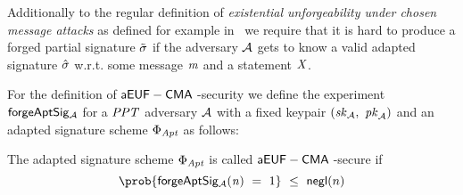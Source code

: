 \begin{definition}[$\cnstaEUFCMA$]\label{def:aeufcma}
Additionally to the regular definition of \textit{existential unforgeability under chosen message attacks} as defined for example in~\cite{vaudenay2006classical} we require that it is hard to produce a forged partial signature $\tilde{\sigma}$ if the
adversary $\mathcal{A}$ gets to know a valid adapted signature $\hat{\sigma}$ w.r.t. some message $\mathit{m}$ and a statement $\mathit{X}$.

For the definition of $\cnstaEUFCMA$-security we define the experiment $\mathsf{forgeAptSig_{\mathcal{A}}}$ for a $\mathit{PPT}$ adversary $\mathcal{A}$ with a fixed keypair $(\mathit{sk}_{\mathcal{A}} ,~ \mathit{pk}_{\mathcal{A}})$ and an adapted signature scheme $\Phi_{\mathit{Apt}}$ as
follows:

\begin{center}
    \fbox{
    \begin{varwidth}{\textwidth}
        \procedure[linenumbering]{$\procExpForg{\varN}$} {
        \varSet \opAssign \cnstEmptySet \\
        \varMsg \opFunResult \cnstAdversary^{\procSignOracle{\cdot}}(\varPubKeyAdv) \\
        (\varWit \opSeperate \varStatement) \opFunResult \procGenR{\varSecParam} \\
        \varSigBob \opFunResult \procSignPtSingle{\varMsg}{\varSecKeyBob} \\
        \varSigAptBob \opFunResult \procAptSig{\varSigBob}{\varWit} \\
        \varSigPt_{\cnstAdversary} \opFunResult \cnstAdversary^{\procSignOracle{\cdot}}(\varSigApt) \\
        \varSigFin \opFunResult \procFinSig{\varSigPt_{\cnstAdversary}}{\varSigBob} \\
        \pcreturn (\varMsg \opNotIn \varSet \opAnd \procVerf{\varMsg}{\varSigFin}{\varPubKeyAdv \opAddPoint \varPubKey})
        }\\[2\baselineskip]
        \procedure[linenumbering]{$\procSignOracle{\varMsg}$} {
        \varSet \opAssign \varSet \opUnion {\varMsg} \\
        (\varWit \opSeperate \varStatement) \opFunResult \procGenR{\varSecParam} \\
        \varSigPt \opFunResult \procSignPtSingle{\varMsg}{\varSecKey} \\
        \varSigApt \opFunResult \procAptSig{\varSigPt}{\varWit} \\
        \pcreturn (\varSigApt \opSeperate \varStatement)
        }\\[2\baselineskip]
    \end{varwidth}
    }
\end{center}
The adapted signature scheme $\Phi_{\mathit{Apt}}$ is called $\cnstaEUFCMA$-secure if
\[ \prob{\procExpForg{\varN} \opEq 1} \opSmEq \funNegl{n} \]
\end{definition}

